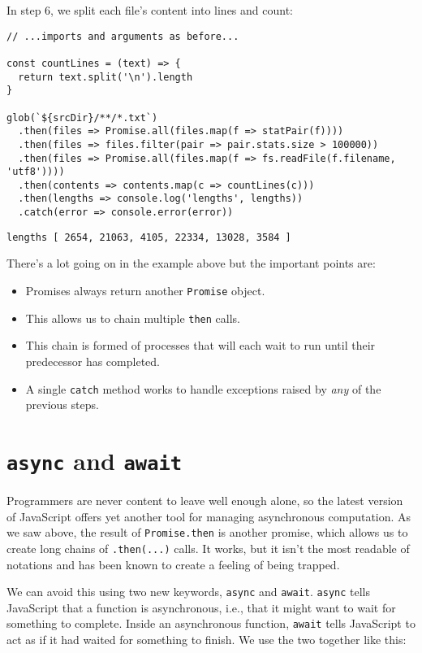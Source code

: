In step 6,
we split each file's content into lines and count:

\begin{verbatim}
// ...imports and arguments as before...

const countLines = (text) => {
  return text.split('\n').length
}

glob(`${srcDir}/**/*.txt`)
  .then(files => Promise.all(files.map(f => statPair(f))))
  .then(files => files.filter(pair => pair.stats.size > 100000))
  .then(files => Promise.all(files.map(f => fs.readFile(f.filename, 'utf8'))))
  .then(contents => contents.map(c => countLines(c)))
  .then(lengths => console.log('lengths', lengths))
  .catch(error => console.error(error))
\end{verbatim}

\begin{verbatim}
lengths [ 2654, 21063, 4105, 22334, 13028, 3584 ]
\end{verbatim}

There's a lot going on in the example above
but the important points are:

\begin{itemize}
\item
  Promises always return another \texttt{Promise} object.
\item
  This allows us to chain multiple \texttt{then} calls.
\item
  This chain is formed of processes that will each wait to run until their predecessor has completed.
\item
  A single \texttt{catch} method works to handle exceptions raised by \emph{any} of the previous steps.
\end{itemize}

\section{\texttt{async} and \texttt{await}}\label{s:promises-async-await}

Programmers are never content to leave well enough alone,
so the latest version of JavaScript offers yet another tool for managing asynchronous computation.
As we saw above,
the result of \texttt{Promise.then} is another promise,
which allows us to create long chains of \texttt{.then(...)} calls.
It works,
but it isn't the most readable of notations and has been known to create a feeling of being trapped.

We can avoid this using two new keywords,
\texttt{async} and \texttt{await}.
\texttt{async} tells JavaScript that a function is asynchronous,
i.e.,
that it might want to wait for something to complete.
Inside an asynchronous function,
\texttt{await} tells JavaScript to act as if it had waited for something to finish.
We use the two together like this:

